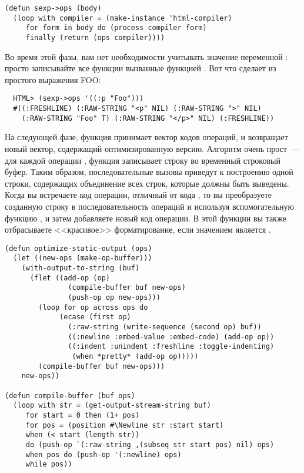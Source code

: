 \begin{lstlisting}
(defun sexp->ops (body)
  (loop with compiler = (make-instance 'html-compiler)
     for form in body do (process compiler form)
     finally (return (ops compiler))))
\end{lstlisting}

Во время этой фазы, вам нет необходимости учитывать значение переменной :
просто записывайте все функции вызванные функцией .  Вот что
 сделает из простого выражения FOO:

\begin{lstlisting}
  HTML> (sexp->ops '((:p "Foo")))
  #((:FRESHLINE) (:RAW-STRING "<p" NIL) (:RAW-STRING ">" NIL)
    (:RAW-STRING "Foo" T) (:RAW-STRING "</p>" NIL) (:FRESHLINE))
\end{lstlisting}

На следующей фазе, функция  принимает вектор кодов операций,
и возвращает новый вектор, содержащий оптимизированную версию.  Алгоритм очень прост~---
для каждой операции , функция записывает строку во временный строковый
буфер. Таким образом, последовательные вызовы  приведут к построению
одной строки, содержащих объединение всех строк, которые должны быть выведены. Когда вы
встречаете код операции, отличный от кода , то вы преобразуете созданную
строку в последовательность операций  и  используя
вспомогательную функцию , и затем добавляете новый код операции.  В
этой функции вы также отбрасываете <<красивое>> форматирование, если значением
 является .

\begin{lstlisting}
(defun optimize-static-output (ops)
  (let ((new-ops (make-op-buffer)))
    (with-output-to-string (buf)
      (flet ((add-op (op) 
               (compile-buffer buf new-ops)
               (push-op op new-ops)))
        (loop for op across ops do
             (ecase (first op)
               (:raw-string (write-sequence (second op) buf))
               ((:newline :embed-value :embed-code) (add-op op))
               ((:indent :unindent :freshline :toggle-indenting)
                (when *pretty* (add-op op)))))
        (compile-buffer buf new-ops)))
    new-ops))

(defun compile-buffer (buf ops)
  (loop with str = (get-output-stream-string buf)
     for start = 0 then (1+ pos)
     for pos = (position #\Newline str :start start)
     when (< start (length str))
     do (push-op `(:raw-string ,(subseq str start pos) nil) ops)
     when pos do (push-op '(:newline) ops)
     while pos))
\end{lstlisting}

